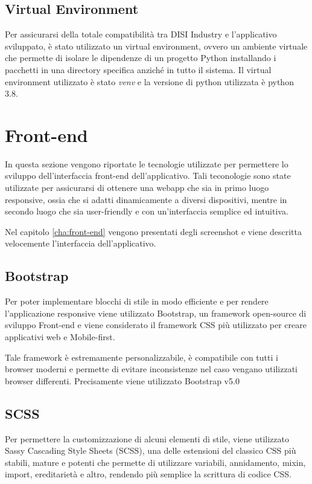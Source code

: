\subsection{Virtual Environment}
Per assicurarsi della totale compatibilità tra DISI Industry e l'applicativo sviluppato, è stato utilizzato un virtual environment, ovvero un ambiente virtuale che permette di isolare le dipendenze di un progetto Python installando i pacchetti in una directory specifica anziché in tutto il sistema. Il virtual environment utilizzato è stato \textit{venv} \cite{venv} e la versione di python utilizzata è python 3.8.



\section{Front-end}
In questa sezione vengono riportate le tecnologie utilizzate per permettere lo sviluppo dell'interfaccia front-end dell'applicativo. Tali teconologie sono state utilizzate per assicurarsi di ottenere una webapp che sia in primo luogo responsive, ossia che si adatti dinamicamente a diversi dispositivi, mentre in secondo luogo che sia user-friendly e con un'interfaccia semplice ed intuitiva.

Nel capitolo \ref{cha:front-end} vengono presentati degli screenshot e viene descritta velocemente l'interfaccia dell'applicativo.
\subsection{Bootstrap}
Per poter implementare blocchi di stile in modo efficiente e per rendere l'applicazione responsive viene utilizzato Bootstrap, un framework open-source di sviluppo Front-end e viene considerato il framework CSS più utilizzato per creare applicativi web e Mobile-first.

Tale framework è estremamente personalizzabile, è compatibile con tutti i browser moderni e permette di evitare inconsistenze nel caso vengano utilizzati browser differenti.
Precisamente viene utilizzato Bootstrap v5.0 \cite{bootstrap}

\subsection{SCSS}
Per permettere la customizzazione di alcuni elementi di stile, viene utilizzato Sassy Cascading Style Sheets (SCSS), una delle estensioni del classico CSS più stabili, mature e potenti che permette di utilizzare variabili, annidamento, mixin, import, ereditarietà e altro, rendendo più semplice la scrittura di codice CSS. \cite{scss}

